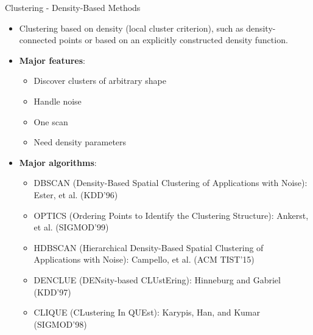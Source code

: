 \begin{frame}[allowframebreaks]{Clustering - Density-Based Methods}
\begin{itemize}
    \setlength{\itemsep}{0.1em}
    \item Clustering based on density (local cluster criterion), such as density-connected points or based on an explicitly constructed density function.
    \item \textbf{Major features}:
    \begin{itemize}
        \item Discover clusters of arbitrary shape
        \item Handle noise
        \item One scan
        \item Need density parameters
    \end{itemize}

    \framebreak
    
    \item \textbf{Major algorithms}:
    \begin{itemize}
        \item DBSCAN (Density-Based Spatial Clustering of Applications with Noise): Ester, et al. (KDD’96)
        \item OPTICS (Ordering Points to Identify the Clustering Structure): Ankerst, et al. (SIGMOD’99)
        \item HDBSCAN (Hierarchical Density-Based Spatial Clustering of Applications with Noise): Campello, et al. (ACM TIST’15)
        \item DENCLUE (DENsity-based CLUstEring): Hinneburg and Gabriel (KDD’97)
        \item CLIQUE (CLustering In QUEst): Karypis, Han, and Kumar (SIGMOD’98)
    \end{itemize}
\end{itemize}
\end{frame}


